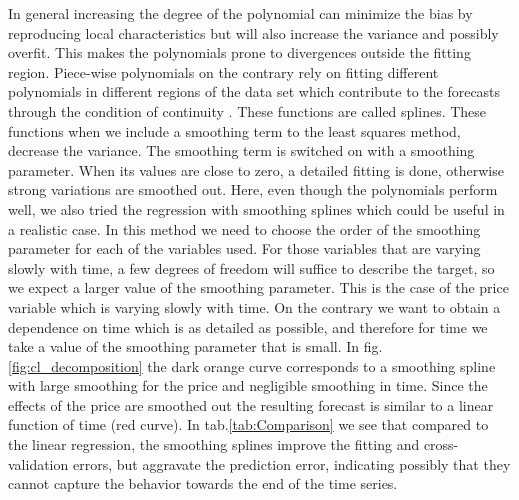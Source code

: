 \documentclass[12pt, letterpaper]{article}\usepackage[]{graphicx}\usepackage[]{color}
\begin{document}
In general increasing the degree of the polynomial can minimize the bias by reproducing local characteristics but will also increase the variance and possibly overfit. This makes the polynomials prone to divergences outside the fitting region. Piece-wise polynomials on the contrary rely on fitting different polynomials in different regions of the data set which contribute to the forecasts through the condition of continuity \cite{Statistical_Learning, Smoothing_Splines}. These functions are called splines. These functions when we include a smoothing term to the least squares method, decrease the variance. The smoothing term is switched on with a smoothing parameter. When its values are close to zero, a detailed fitting is done, otherwise strong variations are smoothed out. Here, even though the polynomials perform well, we also tried the regression with smoothing splines which could be useful in a realistic case. In this method we need to choose the order of the smoothing parameter for each of the variables used. For those variables that are varying slowly with time, a few degrees of freedom will suffice to describe the target, so we expect a larger value of the smoothing parameter. This is the case of the price variable which is varying slowly with time. On the contrary we want to obtain a dependence on time which is as detailed as possible, and therefore for time we take a value of the smoothing parameter that is small. In fig.\ref{fig:cl_decomposition} the dark orange curve corresponds to a smoothing spline with large smoothing for the price and negligible smoothing in time. Since the effects of the price are smoothed out the resulting forecast is similar to a linear function of time (red curve). In tab.\ref{tab:Comparison} we see that compared to the linear regression, the smoothing splines improve the fitting and cross-validation errors, but aggravate the prediction error, indicating possibly that they cannot capture the behavior towards the end of the time series.
\end{document}
